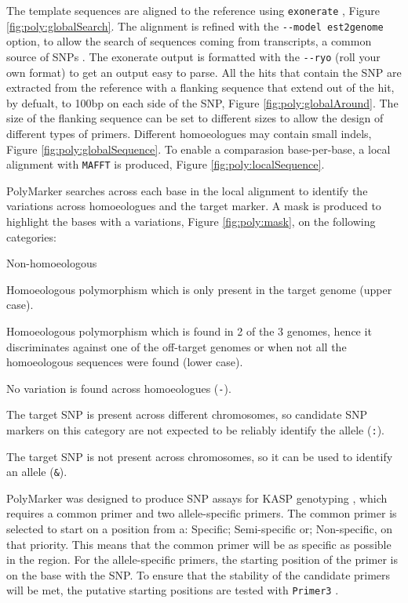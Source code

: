The template sequences are aligned to the reference using \verb|exonerate| \citep{Slater2005}, Figure \ref{fig:poly:globalSearch}. 
The alignment is refined with the \verb|--model est2genome| option, to allow the search of sequences coming from transcripts, a common source of SNPs \citep{Allen2011}. 
The exonerate output is formatted with the \verb|--ryo| (roll your own format) to get an output easy to parse. 
All the hits that contain the SNP are extracted from the reference with a flanking sequence that extend out of the hit, by defualt, to 100bp on each side of the SNP, Figure \ref{fig:poly:globalAround}.
The size of the flanking sequence can be set to different sizes to allow the design of different types of primers. 
Different homoeologues may contain small indels, Figure \ref{fig:poly:globalSequence}. 
To enable a comparasion base-per-base, a local alignment with \verb|MAFFT| \citep{Katoh2013} is produced, Figure \ref{fig:poly:localSequence}. 

PolyMarker searches across each base in the local alignment to identify the variations across homoeologues and the target marker.
A mask is produced to highlight the bases with a variations, Figure \ref{fig:poly:mask}, on the following categories:
\begin{labeling}{Non-homoeologous}
\item [Specific] Homoeologous polymorphism which is only present in the target genome (upper case).
\item [Semi-specific] Homoeologous polymorphism which is found in 2 of the 3 genomes, hence it discriminates against one of the off-target genomes or when not all the homoeologous sequences were found (lower case).
\item [Non-specific] No variation is found across homoeologues (\texttt{-}).
\item [Homoeologous] The target SNP is present across different chromosomes, so candidate SNP markers on this category are not expected to be reliably identify the allele (\texttt{:}).
\item [Non-homoeologous] The target SNP is not present across chromosomes, so it can be used to identify an allele (\texttt{\&}).
\end{labeling} 

PolyMarker was designed to produce SNP assays for KASP genotyping \citep{LGC}, which requires a common primer and two allele-specific primers. 
The common primer is selected to start on a position from a: Specific; Semi-specific or; Non-specific, on that priority. 
This means that the common primer will be as specific as possible in the region. 
For the allele-specific primers, the starting position of the primer is on the base with the SNP. 
To ensure that the stability of the candidate primers will be met, the putative starting positions are tested with \texttt{Primer3} \citep{Rozen}. 

